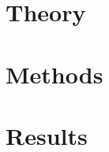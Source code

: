 \documentclass[
  10pt,
  b5paper,
  oneside
]{thesis}
\begin{document}
  
    
  \mainmatter
    

    \chapter{Theory}
      
      
      
      
      
      
 
    \chapter{Methods}
      

    \chapter{Results}
      


  \backmatter
    
    \begin{appendices}
      
    \end{appendices}
    
\end{document}
